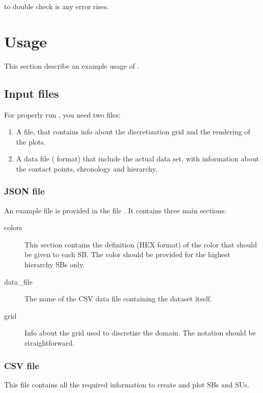 \documentclass[letterpaper,10pt,english]{sphinxmanual}
\begin{document}
to double check is any error rises.


\chapter{Usage}
\label{\detokenize{usage:usage}}\label{\detokenize{usage::doc}}
This section describe an example usage of .


\section{Input files}
\label{\detokenize{usage:input-files}}
For properly run , you need two files:
\begin{enumerate}
\def\theenumi{\arabic{enumi}}
\def\labelenumi{\theenumi )}
\makeatletter\def\p@enumii{\p@enumi \theenumi )}\makeatother
\item {} 
A  file, that contains info about the discretization grid
and the rendering of the plots.

\item {} 
A data file ( format) that include the actual data set, with
information about the contact points, chronology and hierarchy.

\end{enumerate}


\subsection{JSON file}
\label{\detokenize{usage:json-file}}
An example  file is provided in the file . It contains three main sections:
\begin{description}
\item[{colors}] \leavevmode
This section contains the definition (HEX format) of the color that should be given to each SB.
The color should be provided for the highest hierarchy SBs only.

\item[{data\_file}] \leavevmode
The name of the CSV data file containing the dataset itself.

\item[{grid}] \leavevmode
Info about the grid used to discretize the domain. The notation should be straightforward.

\end{description}


\subsection{CSV file}
\label{\detokenize{usage:csv-file}}
This file contains all the required information to create and plot SBs and SUs.
\end{document}
